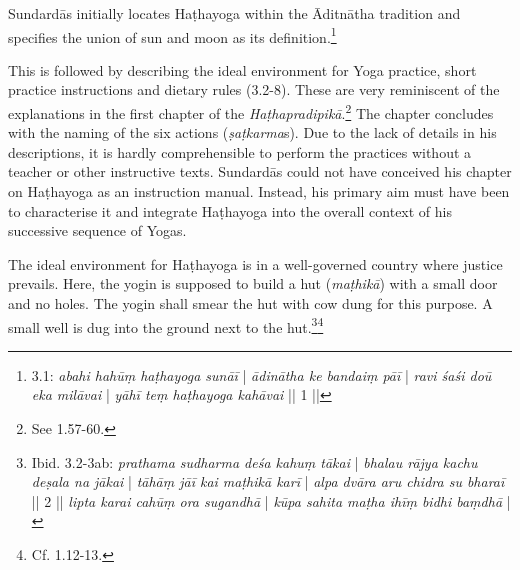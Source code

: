Sundardās initially locates Haṭhayoga within the Āditnātha tradition and specifies the union of sun and moon as its definition.\footnote{ 3.1: \textit{abahi hahūṃ haṭhayoga sunāī} | \textit{ādinātha ke bandaiṃ pāī} | \textit{ravi śaśi doū eka milāvai} | \textit{yāhī teṃ haṭhayoga kahāvai} || 1 ||}

This is followed by describing the ideal environment for Yoga practice, short practice instructions and dietary rules (3.2-8). These are very reminiscent of the explanations in the first chapter of the \textit{Haṭhapradipikā}.\footnote{See  1.57-60.} The chapter concludes with the naming of the six actions (\textit{ṣaṭkarma}s). Due to the lack of details in his descriptions, it is hardly comprehensible to perform the practices without a teacher or other instructive texts. Sundardās could not have conceived his chapter on Haṭhayoga as an instruction manual. Instead, his primary aim must have been to characterise it and integrate Haṭhayoga into the overall context of his successive sequence of Yogas.  

The ideal environment for Haṭhayoga is in a well-governed country where justice prevails. Here, the yogin is supposed to build a hut (\textit{maṭhikā}) with a small door and no holes. The yogin shall smear the hut with cow dung for this purpose. A small well is dug into the ground next to the hut.\footnote{Ibid. 3.2-3ab: \textit{prathama sudharma deśa kahuṃ tākai} | \textit{bhalau rājya kachu deṣala na jākai} | \textit{tāhāṃ jāī kai maṭhikā karī} | \textit{alpa dvāra aru chidra su bharaī} || 2 || \textit{lipta karai cahūṃ ora sugandhā} | \textit{kūpa sahita maṭha ihīṃ bidhi baṃdhā} |}\footnote{Cf.  1.12-13.}

